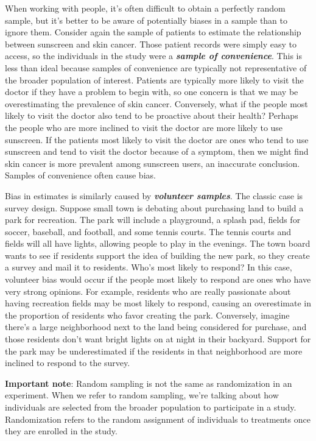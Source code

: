\documentclass[
]{book}
\begin{document}
When working with people, it's often difficult to obtain a perfectly random sample, but it's better to be aware of potentially biases in a sample than to ignore them. Consider again the sample of patients to estimate the relationship between sunscreen and skin cancer. Those patient records were simply easy to access, so the individuals in the study were a \textbf{\emph{sample of convenience}}. This is less than ideal because samples of convenience are typically not representative of the broader population of interest. Patients are typically more likely to visit the doctor if they have a problem to begin with, so one concern is that we may be overestimating the prevalence of skin cancer. Conversely, what if the people most likely to visit the doctor also tend to be proactive about their health? Perhaps the people who are more inclined to visit the doctor are more likely to use sunscreen. If the patients most likely to visit the doctor are ones who tend to use sunscreen and tend to visit the doctor because of a symptom, then we might find skin cancer is more prevalent among sunscreen users, an inaccurate conclusion. Samples of convenience often cause bias.

Bias in estimates is similarly caused by \textbf{\emph{volunteer samples}}. The classic case is survey design. Suppose small town is debating about purchasing land to build a park for recreation. The park will include a playground, a splash pad, fields for soccer, baseball, and football, and some tennis courts. The tennis courts and fields will all have lights, allowing people to play in the evenings. The town board wants to see if residents support the idea of building the new park, so they create a survey and mail it to residents. Who's most likely to respond? In this case, volunteer bias would occur if the people most likely to respond are ones who have very strong opinions. For example, residents who are really passionate about having recreation fields may be most likely to respond, causing an overestimate in the proportion of residents who favor creating the park. Conversely, imagine there's a large neighborhood next to the land being considered for purchase, and those residents don't want bright lights on at night in their backyard. Support for the park may be underestimated if the residents in that neighborhood are more inclined to respond to the survey.

\textbf{Important note}: Random sampling is not the same as randomization in an experiment. When we refer to random sampling, we're talking about how individuals are selected from the broader population to participate in a study. Randomization refers to the random assignment of individuals to treatments once they are enrolled in the study.
\end{document}
